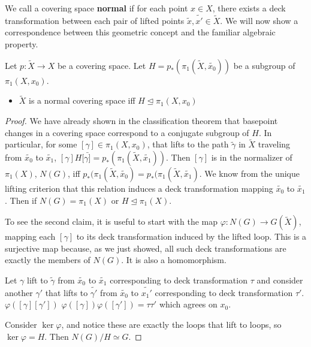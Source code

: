 \documentclass[10pt]{article}
\begin{document}
We call a covering space \textbf{normal} if for each point $x \in X$, there
exists a deck transformation between each pair of lifted points $\tilde{x},
\tilde{x'} \in \tilde{X}$. We will now show a correspondence between this
geometric concept and the familiar algebraic property.

\begin{definition}
	Let $p: \tilde{X} \to X$ be a covering space. Let $H = p_*(\pi_1(\tilde{X},
	\tilde{x_0}))$ be a subgroup of $\pi_1(X, x_0)$.
	\begin{itemize}
		\item{$\tilde{X}$ is a normal covering space iff $H \trianglelefteq \pi_1(X, x_0)$}
	\end{itemize}
\end{definition}

\begin{proof}
	We have already shown in the classification theorem that basepoint changes in
	a covering space correspond to a conjugate subgroup of $H$. In particular,
	for some $[\gamma] \in \pi_1(X, x_0)$, that lifts to the path $\tilde{\gamma}$ in
	$\tilde{X}$ traveling from $\tilde{x_0}$ to $\tilde{x_1}$,
	$[\gamma]H[\bar{\gamma]} = p_*(\pi_1(\tilde{X}, \tilde{x_1}))$. Then
	$[\gamma]$ is in the normalizer of $\pi_1(X)$, $N(G)$, iff 
	$p_*(\pi_1(\tilde{X}, \tilde{x_0}) = p_*(\pi_1(\tilde{X}, \tilde{x_1})$.
	We know from the unique lifting criterion that this relation induces a deck
	transformation mapping $\tilde{x_0}$ to $\tilde{x_1}$. Then if $N(G) =
	\pi_1(X)$ or $H \trianglelefteq \pi_1(X)$.

	To see the second claim, it is useful to start with the map $\varphi: N(G) \to
	G(\tilde{X})$, mapping each $[\gamma]$ to its deck transformation induced by the
	lifted loop. This is a surjective map because, as we just showed, all such deck
	transformations are exactly the members of $N(G)$. It is also a homomorphism.

	Let $\gamma$ lift to $\tilde{\gamma}$ from $\tilde{x_0}$ to $\tilde{x_1}$
	corresponding to deck transformation $\tau$ and
	consider another $\gamma'$ that lifts to $\tilde{\gamma'}$ from $\tilde{x_0}$
	to $\tilde{x_1'}$ corresponding to deck transformation $\tau'$.
	$\varphi([\gamma][\gamma'])$ 
	$\varphi([\gamma])\varphi([\gamma']) = \tau\tau'$ which agrees on $x_0$.

	Consider $\ker \varphi$, and notice these are exactly the loops that lift to
	loops, so $\ker \varphi = H$. Then $N(G) / H \simeq G$.
\end{proof}
\end{document}
